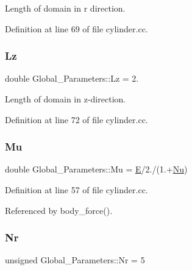 Length of domain in r direction. 



Definition at line 69 of file cylinder.\+cc.

\mbox{\label{namespaceGlobal__Parameters_a2bcf0bd846d839f1e3bb04a6c0a612c1}} 
\subsubsection{\texorpdfstring{Lz}{Lz}}
{\footnotesize\ttfamily double Global\+\_\+\+Parameters\+::\+Lz = 2.}



Length of domain in z-\/direction. 



Definition at line 72 of file cylinder.\+cc.

\mbox{\label{namespaceGlobal__Parameters_a490d7680a7de63058a9c921e2705a103}} 
\subsubsection{\texorpdfstring{Mu}{Mu}}
{\footnotesize\ttfamily double Global\+\_\+\+Parameters\+::\+Mu = \hyperlink{namespaceGlobal__Parameters_aa3dfbdb1b2fd80d516850f66c96b6fd0}{E}/2./(1.+\hyperlink{namespaceGlobal__Parameters_a20fccdcfa2c15ad8b951b9ada3bb1661}{Nu})}



Definition at line 57 of file cylinder.\+cc.



Referenced by body\+\_\+force().

\mbox{\label{namespaceGlobal__Parameters_aeebb1e39d849d32cebdc9be13026606e}} 
\subsubsection{\texorpdfstring{Nr}{Nr}}
{\footnotesize\ttfamily unsigned Global\+\_\+\+Parameters\+::\+Nr = 5}



